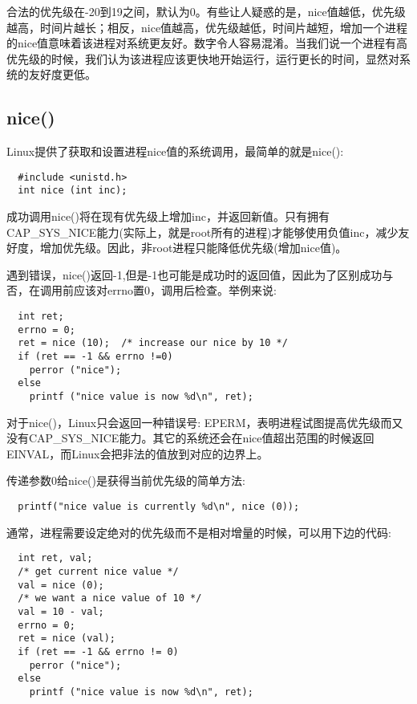 合法的优先级在-20到19之间，默认为0。有些让人疑惑的是，nice值越低，优先级越高，时间片越长；相反，nice值越高，优先级越低，时间片越短，增加一个进程的nice值意味着该进程对系统更友好。数字令人容易混淆。当我们说一个进程有高优先级的时候，我们认为该进程应该更快地开始运行，运行更长的时间，显然对系统的友好度更低。

\subsection{nice()}

Linux提供了获取和设置进程nice值的系统调用，最简单的就是nice():

\begin{lstlisting}
  #include <unistd.h>
  int nice (int inc);
\end{lstlisting}

成功调用nice()将在现有优先级上增加inc，并返回新值。只有拥有CAP\_SYS\_NICE能力(实际上，就是root所有的进程)才能够使用负值inc，减少友好度，增加优先级。因此，非root进程只能降低优先级(增加nice值)。

遇到错误，nice()返回-1,但是-1也可能是成功时的返回值，因此为了区别成功与否，在调用前应该对errno置0，调用后检查。举例来说:

\begin{lstlisting}
  int ret;
  errno = 0;
  ret = nice (10);  /* increase our nice by 10 */
  if (ret == -1 && errno !=0)
    perror ("nice");
  else
    printf ("nice value is now %d\n", ret);
\end{lstlisting}

对于nice()，Linux只会返回一种错误号: EPERM，表明进程试图提高优先级而又没有CAP\_SYS\_NICE能力。其它的系统还会在nice值超出范围的时候返回 EINVAL，而Linux会把非法的值放到对应的边界上。

传递参数0给nice()是获得当前优先级的简单方法:

\begin{lstlisting}
  printf("nice value is currently %d\n", nice (0));
\end{lstlisting}

通常，进程需要设定绝对的优先级而不是相对增量的时候，可以用下边的代码:

\begin{lstlisting}
  int ret, val;
  /* get current nice value */
  val = nice (0);
  /* we want a nice value of 10 */
  val = 10 - val;
  errno = 0;
  ret = nice (val);
  if (ret == -1 && errno != 0)
    perror ("nice");
  else
    printf ("nice value is now %d\n", ret);
\end{lstlisting}

